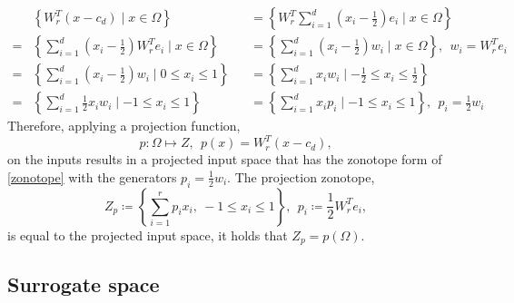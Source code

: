 \documentclass[
  a4paper,  %
  twoside,  %
  bibliography=totoc,
  headsepline,
  cleardoublepage=empty,
  parskip=half,
  draft=false
]{scrbook}
\begin{document}
\begin{equation}
\begin{alignedat}{2}
&\left\{W_r^T (x - c_d) \mid x \in \Omega\right\}&&=\left\{W_r^T \sum_{i=1}^d \left(x_i - \frac{1}{2}\right) e_i \mid x \in \Omega \right\}\\
=&\left\{\sum_{i=1}^d \left(x_i - \frac{1}{2}\right) W_r^T e_i \mid x \in \Omega \right\}&&=\left\{\sum_{i=1}^d \left(x_i - \frac{1}{2}\right) w_i \mid x \in \Omega \right\}, ~~ w_i=W_r^T e_i\\
=&\left\{\sum_{i=1}^d \left(x_i - \frac{1}{2}\right) w_i \mid 0 \leq x_i \leq 1 \right\}&&=\left\{\sum_{i=1}^d x_i w_i \mid -\frac{1}{2} \leq x_i \leq \frac{1}{2} \right\}\\
=&\left\{\sum_{i=1}^d \frac{1}{2} x_i w_i \mid -1 \leq x_i \leq 1 \right\}&&=\left\{\sum_{i=1}^d x_i p_i \mid -1 \leq x_i \leq 1 \right\}, ~~ p_i=\frac{1}{2} w_i
\label{zonotope_form}
\end{alignedat}
\end{equation}
%
Therefore, applying a projection function,
\begin{equation}
p \colon \Omega \mapsto Z, ~~ p(x)=W_r^T (x-c_d),
\nonumber
\end{equation}
on the inputs results in a projected input space that has the zonotope form of \cref{zonotope} with the generators $p_i=\frac{1}{2} w_i$.
The projection zonotope,
\begin{equation}
Z_{p} \coloneqq \left\{\sum_{i=1}^r p_i x_i , ~ -1 \leq x_i \leq 1\right\}, ~~ p_i \coloneqq \frac{1}{2} W_r^T e_i,
\nonumber
\end{equation}
is equal to the projected input space, \ie it holds that $Z_{p}=p(\Omega)$.

\subsection{Surrogate space}
\end{document}
